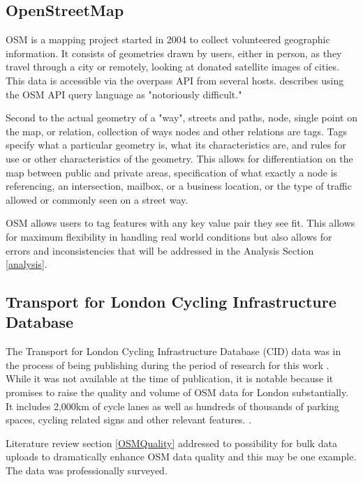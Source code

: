 
\subsection{OpenStreetMap} 


OSM is a mapping project started in 2004 to collect volunteered geographic information. It consists of geometries drawn by users, either in person, as they travel through a city or remotely, looking at donated satellite images of cities. This data is accessible via the overpass API from several hosts. \textcite{osmnx} describes using the OSM API query language as "notoriously difficult." 


Second to the actual geometry of a "way", streets and paths, node, single point on the map, or relation, collection of ways nodes and other relations are tags. Tags specify what a particular geometry is, what its characteristics are, and rules for use or other characteristics of the geometry. This allows for differentiation on the map between public and private areas, specification of what exactly a node is referencing, an intersection, mailbox, or a business location, or the type of traffic allowed or commonly seen on a street way. 

OSM allows users to tag features with any key value pair they see fit. This allows for maximum flexibility in handling real world conditions but also allows for errors and inconsistencies that will be addressed in the Analysis Section \ref{analysis}.

\subsection{Transport for London Cycling Infrastructure Database}\label{tflcidlit}

The Transport for London Cycling Infrastructure Database (CID) data was in the process of being publishing during the period of research for this work \parencite{tflcid}. While it was not available at the time of publication, it is notable because it promises to raise the quality and volume of OSM data for London substantially. It includes 2,000km of cycle lanes as well as hundreds of thousands of parking spaces, cycling related signs and other relevant features. \parencite{osmtflcidwiki}. 

Literature review section \ref{OSMQuality} addressed to possibility for bulk data uploads to dramatically enhance OSM data quality and this may be one example. The data was professionally surveyed. 

